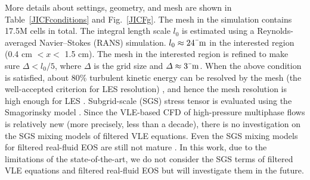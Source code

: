 More details about settings, geometry, and mesh are shown in Table~\ref{JICFconditions} and Fig.~\ref{JICFg}. 
The mesh in the simulation contains 17.5M cells in total. The integral length scale $l_0$ is estimated using a Reynolds-averaged Navier–Stokes (RANS) simulation. $l_0\approx24 \rm{\mu m}$ in the interested region (0.4 cm $< x <$ 1.5 cm). The mesh in the interested region is refined to make sure $\Delta<l_0/5$, where $\Delta$ is the grid size and $\Delta \approx 3 \rm{\mu m}$. When the above condition is satisfied, about 80\% turbulent kinetic energy can be resolved by the mesh (the well-accepted criterion for LES resolution) \cite{gerasimov2016quick}, and hence the mesh resolution is high enough for LES \cite{pope2004ten}. Subgrid-scale (SGS) stress tensor is evaluated using the Smagorinsky model \cite{smagorinsky1963general}.  Since the VLE-based CFD of high-pressure multiphase flows is relatively new (more precisely, less than a decade), there is no investigation on the SGS mixing models of filtered VLE equations. Even the SGS mixing models for filtered real-fluid EOS are still not mature \cite{unnikrishnan2017subgrid,unnikrishnan2021subgrid}. %
In this work, due to the limitations of the state-of-the-art, we do not consider the SGS terms of filtered VLE equations and filtered real-fluid EOS but will investigate them in the future. %

